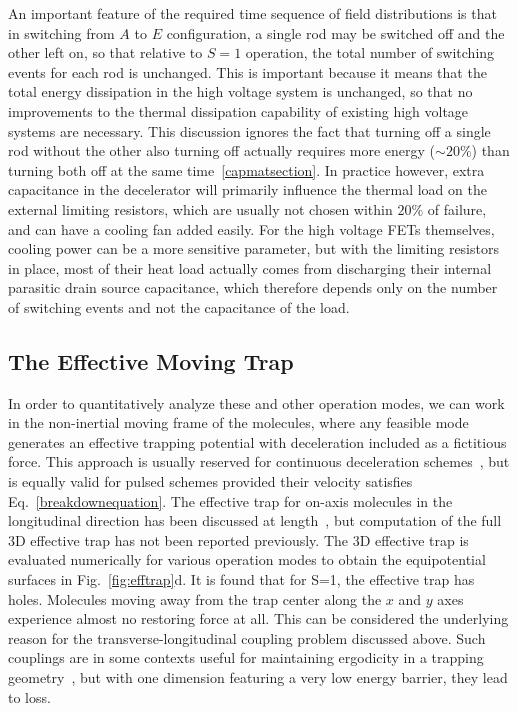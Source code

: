 An important feature of the required time sequence of field distributions is that in switching from $A$ to $E$ configuration, a single rod may be switched off and the other left on, so that relative to $S=1$ operation, the total number of switching events for each rod is unchanged.
This is important because it means that the total energy dissipation in the high voltage system is unchanged, so that no improvements to the thermal dissipation capability of existing high voltage systems are necessary.
This discussion ignores the fact that turning off a single rod without the other also turning off actually requires more energy ($\sim 20\%$) than turning both off at the same time~\ref{capmatsection}. 
In practice however, extra capacitance in the decelerator will primarily influence the thermal load on the external limiting resistors, which are usually not chosen within $20\%$ of failure, and can have a cooling fan added easily.
For the high voltage FETs themselves, cooling power can be a more sensitive parameter, but with the limiting resistors in place, most of their heat load actually comes from discharging their internal parasitic drain source capacitance, which therefore depends only on the number of switching events and not the capacitance of the load.


\subsection{The Effective Moving Trap}
In order to quantitatively analyze these and other operation modes, we can work in the non-inertial moving frame of the molecules, where any feasible mode generates an effective trapping potential with deceleration included as a fictitious force. 
This approach is usually reserved for continuous deceleration schemes~\cite{Osterwalder2010,Narevicius2008}, but is equally valid for pulsed schemes provided their velocity satisfies Eq.~\ref{breakdownequation}. 
The effective trap for on-axis molecules in the longitudinal direction has been discussed at length~\cite{Bethlem2000,Hudson2004}, but computation of the full 3D effective trap has not been reported previously.
The 3D effective trap is evaluated numerically for various operation modes to obtain the equipotential surfaces in Fig.~\ref{fig:efftrap}d.
It is found that for S=1, the effective trap has holes. 
Molecules moving away from the trap center along the $x$ and $y$ axes experience almost no restoring force at all. 
This can be considered the underlying reason for the transverse-longitudinal coupling problem discussed above. 
Such couplings are in some contexts useful for maintaining ergodicity in a trapping geometry~\cite{Surkov1996}, but with one dimension featuring a very low energy barrier, they lead to loss.

